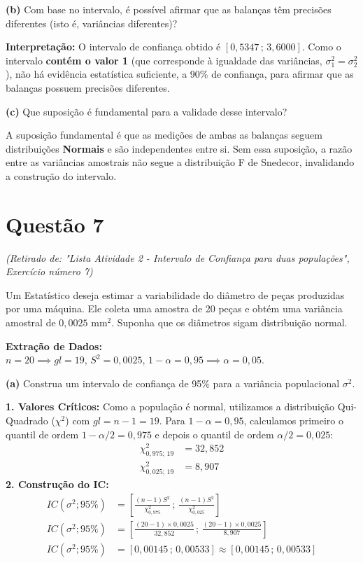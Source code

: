 \documentclass[12pt, a4paper]{article}
\begin{document}
\medskip\noindent\textbf{(b)} Com base no intervalo, é possível afirmar que as balanças têm precisões diferentes (isto é, variâncias diferentes)?

\noindent \textbf{Interpretação:} O intervalo de confiança obtido é $[0,5347 \,;\, 3,6000]$. Como o intervalo \textbf{contém o valor 1} (que corresponde à igualdade das variâncias, $\sigma_1^2 = \sigma_2^2$), não há evidência estatística suficiente, a 90\% de confiança, para afirmar que as balanças possuem precisões diferentes.

\medskip\noindent\textbf{(c)} Que suposição é fundamental para a validade desse intervalo?

\noindent A suposição fundamental é que as medições de ambas as balanças seguem distribuições \textbf{Normais} e são independentes entre si. Sem essa suposição, a razão entre as variâncias amostrais não segue a distribuição F de Snedecor, invalidando a construção do intervalo.


\section*{Questão 7}
\textit{(Retirado de: "Lista Atividade 2 - Intervalo de Confiança para duas populações", Exercício número 7)}

Um Estatístico deseja estimar a variabilidade do diâmetro de peças produzidas por uma máquina. Ele coleta uma amostra de 20 peças e obtém uma variância amostral de $0{,}0025 \text{ mm}^2$. Suponha que os diâmetros sigam distribuição normal.

\vspace{0.3cm}
\noindent\textbf{Extração de Dados:} \\
$n = 20 \implies gl = 19$, $S^2 = 0{,}0025$, $1 - \alpha = 0{,}95 \implies \alpha = 0{,}05$.

\medskip\noindent\textbf{(a)} Construa um intervalo de confiança de 95\% para a variância populacional $\sigma^2$.

\noindent \textbf{1. Valores Críticos:} Como a população é normal, utilizamos a distribuição Qui-Quadrado ($\chi^2$) com $gl = n - 1 = 19$. Para $1 - \alpha = 0{,}95$, calculamos primeiro o quantil de ordem $1-\alpha/2 = 0{,}975$ e depois o quantil de ordem $\alpha/2 = 0{,}025$:
\begin{align*}
\chi^2_{0{,}975; \, 19} &= \boxed{32{,}852} \\
\chi^2_{0{,}025; \, 19} &= \boxed{8{,}907}
\end{align*}
\noindent \textbf{2. Construção do IC:}
\begin{align*}
IC(\sigma^2; 95\%) &= \left[ \frac{(n-1)S^2}{\chi^2_{0{,}975}} \,;\, \frac{(n-1)S^2}{\chi^2_{0{,}025}} \right] \\
IC(\sigma^2; 95\%) &= \left[ \frac{(20-1) \times 0{,}0025}{32{,}852} \,;\, \frac{(20-1) \times 0{,}0025}{8{,}907} \right] \\
IC(\sigma^2; 95\%) &= \left[ 0{,}00145 \,;\, 0{,}00533 \right]
\approx \boxed{[0{,}00145 \,;\, 0{,}00533]}
\end{align*}
\end{document}
